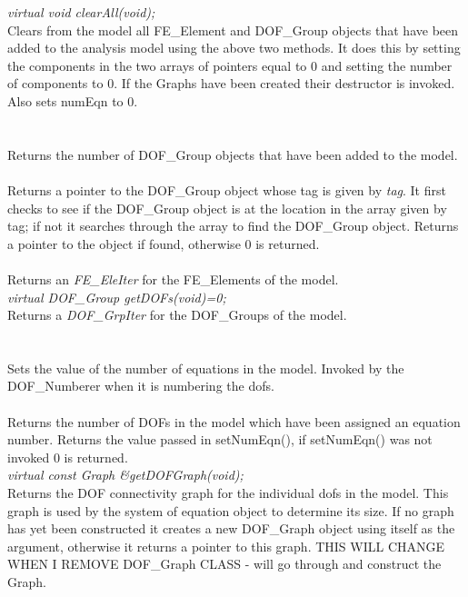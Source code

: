 {\em virtual void clearAll(void);} \\
Clears from the model all FE\_Element and DOF\_Group objects that have
been added to the analysis model using the above two methods. It does
this by setting the components in the two arrays of pointers equal to
$0$ and setting the number of components to $0$. If the Graphs have
been created their destructor is invoked. Also sets \p numEqn to $0$. \\

  \\
\\
Returns the number of DOF\_Group objects that have been added to the
model.\\

\\
Returns a pointer to the DOF\_Group object whose tag is given by {\em
tag}.  It first checks to see if the DOF\_Group object is at the
location in the array given by \p tag; if not it searches through
the array to find the DOF\_Group object. Returns a pointer to the
object if found, otherwise $0$ is returned.\\

 \\
Returns an {\em FE\_EleIter} for the FE\_Elements of the model. \\

{\em virtual DOF\_Group getDOFs(void)=0;} \\
Returns a {\em DOF\_GrpIter} for the DOF\_Groups of the model. \\

  \\
 \\
Sets the value of the number of equations in the model. Invoked by the
DOF\_Numberer when it is numbering the dofs. \\

 \\
Returns the number of DOFs in the model which have been assigned
an equation number. Returns the value passed in setNumEqn(),
if setNumEqn() was not invoked $0$ is returned.\\

{\em virtual const Graph \&getDOFGraph(void);} \\
Returns the DOF connectivity graph for the individual dofs in the
model. This graph is used by the system of equation object to
determine its size. If no graph has yet been constructed it creates
a new DOF\_Graph object using itself as the argument, otherwise it
returns a pointer to this graph. THIS WILL CHANGE WHEN I REMOVE
DOF\_Graph CLASS - will go through and construct the Graph.\\

